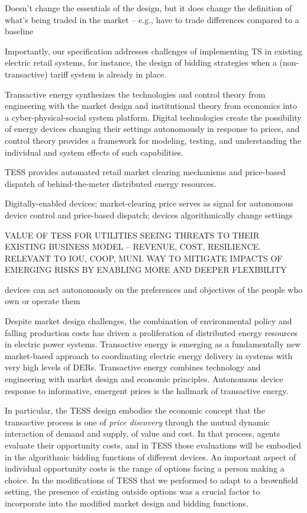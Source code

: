 Doesn't change the essentials of the design, but it does change the definition of what's being traded in the market -- e.g., have to trade differences compared to a baseline

Importantly, our specification addresses challenges of implementing TS in existing electric retail systems, for instance, the design of bidding strategies when a (non-transactive) tariff system is already in place.

Transactive energy synthesizes the technologies and control theory from engineering with the market design and institutional theory from economics into a cyber-physical-social system platform. Digital technologies create the possibility of energy devices changing their settings autonomously in response to prices, and control theory provides a framework for modeling, testing, and understanding the individual and system effects of such capabilities.

TESS provides automated retail market clearing mechanisms and price-based dispatch of behind-the-meter distributed energy resources. 



Digitally-enabled devices; market-clearing price serves as signal for autonomous device control and price-based dispatch; devices algorithmically change settings

VALUE OF TESS FOR UTILITIES SEEING THREATS TO THEIR EXISTING BUSINESS MODEL -- REVENUE, COST, RESILIENCE. RELEVANT TO IOU, COOP, MUNI. WAY TO MITIGATE IMPACTS OF EMERGING RISKS BY ENABLING MORE AND DEEPER FLEXIBILITY

devices can act autonomously on the preferences and objectives of the people who own or operate them

Despite market design challenges, the combination of environmental policy and falling production costs has driven a proliferation of distributed energy resources in electric power systems. Transactive energy is emerging as a fundamentally new market-based approach to coordinating electric energy delivery in systems with very high levels of DERs. Transactive energy combines technology and engineering with market design and economic principles. Autonomous device response to informative, emergent prices is the hallmark of transactive energy.


In particular, the TESS design embodies the economic concept that the transactive process is one of \emph{price discovery} through the mutual dynamic interaction of demand and supply, of value and cost. In that process, agents evaluate their opportunity costs, and in TESS those evaluations will be embodied in the algorithmic bidding functions of different devices. An important aspect of individual opportunity costs is the range of options facing a person making a choice. In the modifications of TESS that we performed to adapt to a brownfield setting, the presence of existing outside options was a crucial factor to incorporate into the modified market design and bidding functions.



